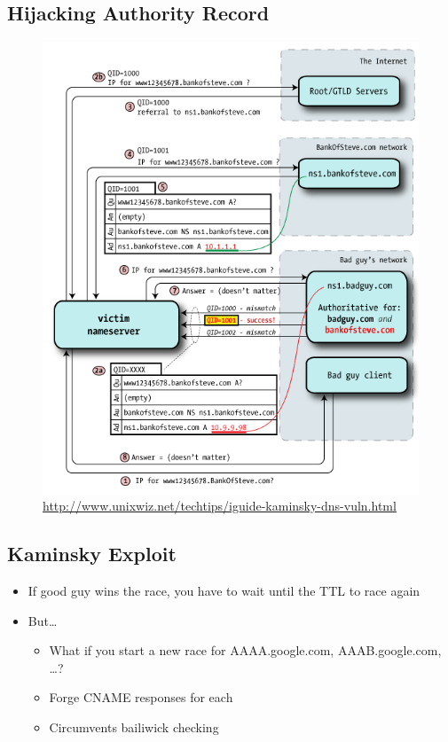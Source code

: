 \subsection{Hijacking Authority Record}
\begin{figure}[H]
    \includegraphics[width=\textwidth]{lazy/hijacking.png}
    \url{http://www.unixwiz.net/techtips/iguide-kaminsky-dns-vuln.html}
\end{figure}
\subsection{Kaminsky Exploit}
\begin{itemize}[nosep]
    \item If good guy wins the race, you have to wait until the TTL to race again
    \item But\dots
          \begin{itemize}[nosep]
              \item What if you start a new race for AAAA.google.com, AAAB.google.com, \dots?
              \item Forge CNAME responses for each
              \item Circumvents bailiwick checking
          \end{itemize}
\end{itemize}
